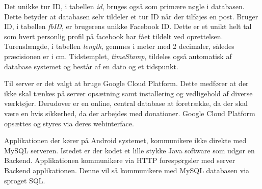 Det unikke tur ID, i tabellen \emph{id}, bruges også som primære nøgle i databasen. Dette betyder at databasen selv tildeler et tur ID når der tilføjes en post. Bruger ID, i tabellen \emph{fbID}, er brugerens unikke Facebook ID. Dette er et unikt helt tal som hvert personlig profil på facebook har fået tildelt ved oprettelsen. Turenslængde, i tabellen \emph{length}, gemmes i meter med 2 decimaler, således præcisionen er i cm. Tidstemplet, \emph{timeStamp}, tildeles også automatisk af database systemet og består af en dato og et tidspunkt.

Til server er det valgt at bruge Google Cloud Platform. Dette medfører at der ikke skal tænkes på server opsætning samt installering og vedligehold af diverse værktøjer. Derudover er en online, central database at foretrække, da der skal være en hvis sikkerhed, da der arbejdes med donationer.
Google Cloud Platform opsættes og styres via deres webinterface.

Applikationen der kører på Android systemet, kommunikere ikke direkte med MySQL serveren. Istedet er der kodet et lille stykke Java software som udgør en Backend. Applikationen kommunikere via HTTP forespørgsler med server Backend applikationen. Denne vil så kommunikere med MySQL databasen via sproget SQL.